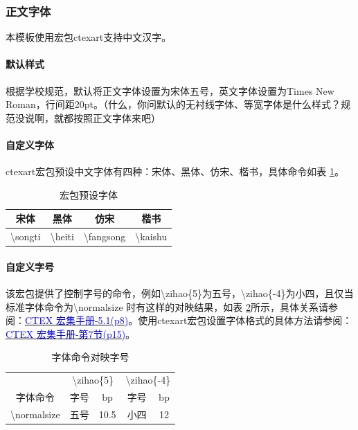 \documentclass[AutoFakeBold]{ZafuThesis}
\begin{document}
\subsubsection{正文字体}
本模板使用宏包ctexart支持中文汉字。\par
\paragraph{默认样式}
根据学校规范，默认将正文字体设置为宋体五号，英文字体设置为Times New Roman，行间距20pt。（什么，你问默认的无衬线字体、等宽字体是什么样式？规范没说啊，就都按照正文字体来吧）\par
\paragraph{自定义字体}
ctexart宏包预设中文字体有四种：宋体、黑体、仿宋、楷书，具体命令如表 \ref{table_宏包预设字体}。
\begin{table}[htbp]
  \centering  
    \caption{宏包预设字体}
    \begin{tabular}{c c c c}
      \toprule[1pt]
      宋体 & 黑体 & 仿宋 & 楷书 \\
      \hline
      \textbackslash songti & \textbackslash heiti & \textbackslash fangsong & \textbackslash kaishu \\
      \toprule[1pt]
    \end{tabular}
    \label{table_宏包预设字体} 
\end{table}\par

\paragraph{自定义字号}
该宏包提供了控制字号的命令，例如\textbackslash zihao\{5\}为五号，\textbackslash zihao\{-4\}为小四，且仅当标准字体命令为\textbackslash normalsize 时有这样的对映结果，如表 \ref{table_字体命令对映字号}所示，具体关系请参阅：\href{https://mirrors.ibiblio.org/CTAN/language/chinese/ctex/ctex.pdf}{\textcolor{blue}{CTEX 宏集手册-5.1(p8)}}。使用ctexart宏包设置字体格式的具体方法请参阅：\href{https://mirrors.ibiblio.org/CTAN/language/chinese/ctex/ctex.pdf}{\textcolor{blue}{CTEX 宏集手册-第7节(p15)}}。

\begin{table}[htbp]
  \centering
    \caption{字体命令对映字号}
    \begin{tabular}{c c c c c}
      \toprule[1pt]
      & \multicolumn{2}{c|}{\textbackslash zihao\{5\}} & \multicolumn{2}{c}{\textbackslash zihao\{-4\}}  \\
      字体命令 & 字号 &\multicolumn{1}{c|}{bp}  & 字号 & bp \\
      \hline
      \textbackslash normalsize & 五号 & 10.5  &  小四 & 12 \\
      \toprule[1pt]
    \end{tabular}
    \label{table_字体命令对映字号}
  \end{table}
\end{document}
